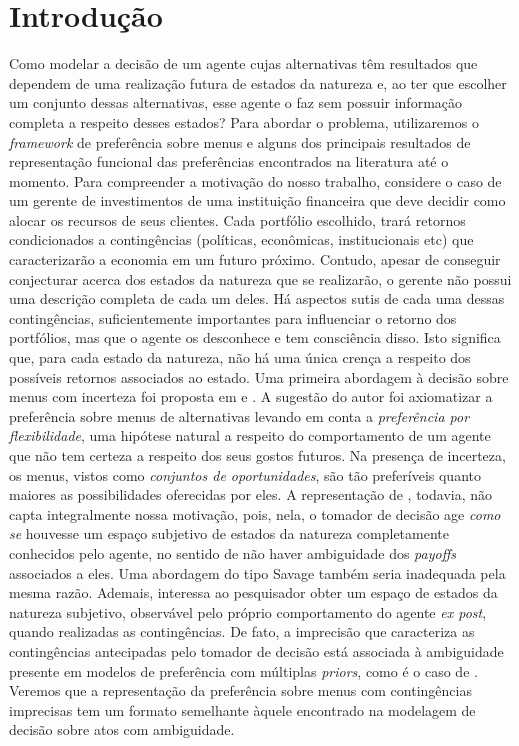 \documentclass[11pt, a4paper]{article}
\theoremstyle{nonumberplain}
\theoremstyle{plain}
\theoremstyle{plain}
\theoremstyle{plain}
\theoremstyle{nonumberplain}
\begin{document}
\section{Introdução}
Como modelar a decisão de um agente cujas alternativas têm resultados que dependem de uma realização futura de estados da natureza e, ao ter que escolher um conjunto dessas alternativas, esse agente o faz sem possuir informação completa a respeito desses estados? Para abordar o problema, utilizaremos o \emph{framework} de preferência sobre menus e alguns dos principais resultados de representação funcional das preferências encontrados na literatura até o momento.
Para compreender a motivação do nosso trabalho, considere o caso de um gerente de investimentos de uma instituição financeira que deve decidir como alocar os recursos de seus clientes. Cada portfólio escolhido, trará retornos condicionados a contingências (políticas, econômicas, institucionais etc) que caracterizarão a economia em um futuro próximo. Contudo, apesar de conseguir conjecturar acerca dos estados da natureza que se realizarão, o gerente não possui uma descrição completa de cada um deles. Há aspectos sutis de cada uma dessas contingências, suficientemente importantes para influenciar o retorno dos portfólios, mas que o agente os desconhece e tem consciência disso. Isto significa que, para cada estado da natureza, não há uma única crença a respeito dos possíveis retornos associados ao estado.
Uma primeira abordagem à decisão sobre menus com incerteza foi proposta em \cite{Kreps1979} e \cite{Kreps1992}. A sugestão do autor foi axiomatizar a preferência sobre menus de alternativas levando em conta a \emph{preferência por flexibilidade}, uma hipótese natural a respeito do comportamento de um agente que não tem certeza a respeito dos seus gostos futuros. Na presença de incerteza, os menus, vistos como \emph{conjuntos de oportunidades}, são tão preferíveis quanto maiores as possibilidades oferecidas por eles. A representação de \cite{Kreps1979}, todavia, não capta integralmente nossa motivação, pois, nela, o tomador de decisão age \emph{como se} houvesse um espaço subjetivo de estados da natureza completamente conhecidos pelo agente, no sentido de não haver ambiguidade dos \emph{payoffs} associados a eles. Uma abordagem do tipo Savage também seria inadequada pela mesma razão. Ademais, interessa ao pesquisador obter um espaço de estados da natureza subjetivo, observável pelo próprio comportamento do agente \emph{ex post}, quando realizadas as contingências.
De fato, a imprecisão que caracteriza as contingências antecipadas pelo tomador de decisão está associada à ambiguidade presente em modelos de preferência com múltiplas \emph{priors}, como é o caso de \cite{Gilboa1989}. Veremos que a representação da preferência sobre menus com contingências imprecisas tem um formato semelhante àquele encontrado na modelagem de decisão sobre atos com ambiguidade.
\end{document}
